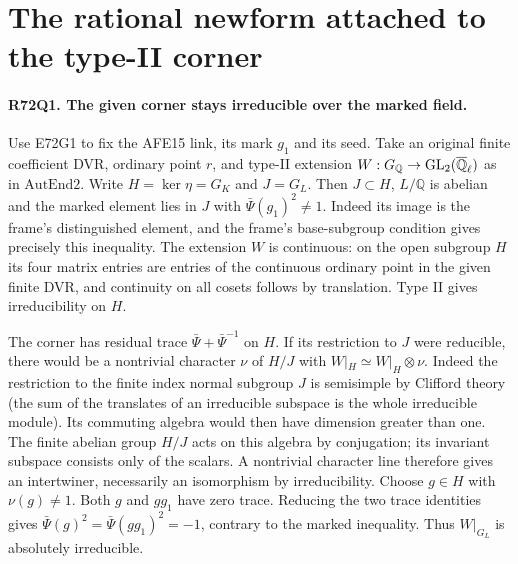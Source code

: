 \section{The rational newform attached to the type-II corner}

\paragraph{R72Q1. The given corner stays irreducible over the marked field.}
Use E72G1 to fix the AFE15 link, its mark $g_1$ and its seed. Take an
original finite coefficient DVR, ordinary point $r$, and type-II
extension $W:G_{\mathbb Q}\to{\rm GL}_2(\overline{\mathbb Q}_\ell)$
as in $\mathrm{AutEnd2}$. Write $H=\ker\eta=G_K$ and $J=G_L$.
Then $J\subset H$, $L/\mathbb Q$ is abelian and the marked element
lies in $J$ with $\bar\Psi(g_1)^2\ne1$. Indeed its image is the
frame's distinguished element, and the frame's base-subgroup
condition gives precisely this inequality. The extension $W$ is
continuous: on the open subgroup $H$ its four matrix entries are
entries of the continuous ordinary point in the given finite DVR,
and continuity on all cosets follows by translation. Type II
gives irreducibility on $H$.

The corner has residual trace $\bar\Psi+\bar\Psi^{-1}$ on $H$.
If its restriction to $J$ were reducible, there would be a
nontrivial character $\nu$ of $H/J$ with
$W|_H\simeq W|_H\otimes\nu$. Indeed the restriction to the finite
index normal subgroup $J$ is semisimple by Clifford theory
(the sum of the translates of an irreducible subspace is the
whole irreducible module). Its commuting algebra would then have
dimension greater than one. The finite abelian group $H/J$ acts
on this algebra by conjugation; its invariant subspace consists
only of the scalars. A nontrivial character line therefore gives
an intertwiner, necessarily an isomorphism by irreducibility.
Choose $g\in H$ with $\nu(g)\ne1$. Both $g$ and $gg_1$ have
zero trace. Reducing the two trace identities gives
$\bar\Psi(g)^2=\bar\Psi(gg_1)^2=-1$, contrary to the marked
inequality. Thus $W|_{G_L}$ is absolutely irreducible.

